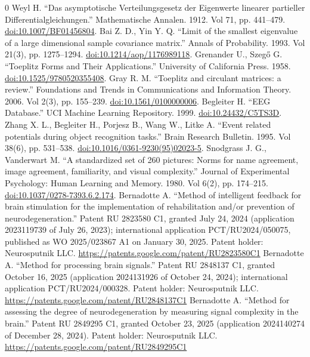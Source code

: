 \documentclass{article}
\begin{document}
\begin{thebibliography}{0}
 Weyl H. ``Das asymptotische Verteilungsgesetz der Eigenwerte linearer partieller Differentialgleichungen.'' Mathematische Annalen. 1912. Vol 71, pp. 441--479. \href{https://doi.org/10.1007/BF01456804}{doi:10.1007/BF01456804}.
 Bai Z. D., Yin Y. Q. ``Limit of the smallest eigenvalue of a large dimensional sample covariance matrix.'' Annals of Probability. 1993. Vol 21(3), pp. 1275--1294. \href{https://doi.org/10.1214/aop/1176989118}{doi:10.1214/aop/1176989118}.
 Grenander U., Szeg\H{o} G. ``Toeplitz Forms and Their Applications.'' University of California Press. 1958. \href{https://doi.org/10.1525/9780520355408}{doi:10.1525/9780520355408}.
 Gray R. M. ``Toeplitz and circulant matrices: a review.'' Foundations and Trends in Communications and Information Theory. 2006. Vol 2(3), pp. 155--239. \href{https://doi.org/10.1561/0100000006}{doi:10.1561/0100000006}.
 Begleiter H. ``EEG Database.'' UCI Machine Learning Repository. 1999. \href{https://doi.org/10.24432/C5TS3D}{doi:10.24432/C5TS3D}.
 Zhang X. L., Begleiter H., Porjesz B., Wang W., Litke A. ``Event related potentials during object recognition tasks.'' Brain Research Bulletin. 1995. Vol 38(6), pp. 531--538. \href{https://doi.org/10.1016/0361-9230(95)02023-5}{doi:10.1016/0361-9230(95)02023-5}.
 Snodgrass J. G., Vanderwart M. ``A standardized set of 260 pictures: Norms for name agreement, image agreement, familiarity, and visual complexity.'' Journal of Experimental Psychology: Human Learning and Memory. 1980. Vol 6(2), pp. 174--215. \href{https://doi.org/10.1037/0278-7393.6.2.174}{doi:10.1037/0278-7393.6.2.174}.
 Bernadotte A. ``Method of intelligent feedback for brain stimulation for the implementation of rehabilitation and/or prevention of neurodegeneration.'' Patent RU 2823580 C1, granted July 24, 2024 (application 2023119739 of July 26, 2023); international application PCT/RU2024/050075, published as WO 2025/023867 A1 on January 30, 2025. Patent holder: Neurosputnik LLC. \url{https://patents.google.com/patent/RU2823580C1}
 Bernadotte A. ``Method for processing brain signals.'' Patent RU 2848137 C1, granted October 16, 2025 (application 2024131926 of October 24, 2024); international application PCT/RU2024/000328. Patent holder: Neurosputnik LLC. \url{https://patents.google.com/patent/RU2848137C1}
 Bernadotte A. ``Method for assessing the degree of neurodegeneration by measuring signal complexity in the brain.'' Patent RU 2849295 C1, granted October 23, 2025 (application 2024140274 of December 28, 2024). Patent holder: Neurosputnik LLC. \url{https://patents.google.com/patent/RU2849295C1}

\end{thebibliography}
\end{document}
